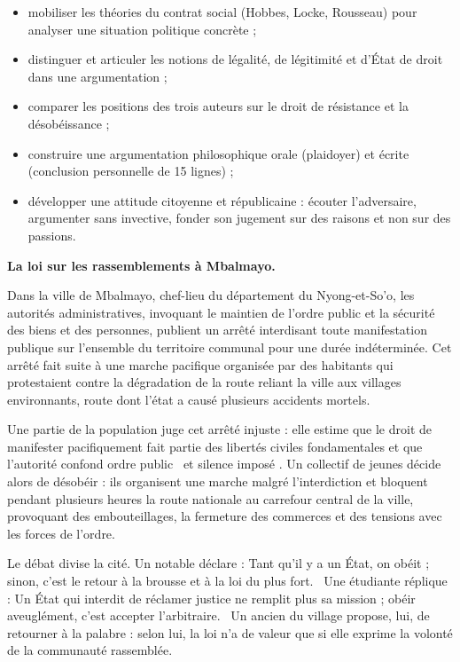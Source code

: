 \documentclass[11pt]{article}
\newcommand{\cle}[1]{{\popxbold\color{popdark}#1}}
\newcounter{popsec}
\newcounter{popsub}
\newcommand{\courssub}[1]{%
  \stepcounter{popsub}%
  \par\vspace{9pt}\noindent{\popxbold\fontsize{11.5}{13}\selectfont\color{popink}{\color{poporange}\thepopsec.\thepopsub}\hspace{6pt}#1}\par\nopagebreak\vspace{4pt}
}
\begin{document}
\begin{itemize}
\item mobiliser les théories du \cle{contrat social} (Hobbes, Locke, Rousseau) pour analyser une situation politique concrète ;
\item distinguer et articuler les notions de \cle{légalité}, de \cle{légitimité} et d'\cle{État de droit} dans une argumentation ;
\item comparer les positions des trois auteurs sur le droit de résistance et la désobéissance ;
\item construire une argumentation philosophique orale (plaidoyer) et écrite (conclusion personnelle de 15 lignes) ;
\item développer une attitude citoyenne et républicaine : écouter l'adversaire, argumenter sans invective, fonder son jugement sur des raisons et non sur des passions.
\end{itemize}

\courssub{Situation}

\textbf{La loi sur les rassemblements à Mbalmayo.}\par

Dans la ville de Mbalmayo, chef-lieu du département du Nyong-et-So'o, les autorités administratives, invoquant le maintien de l'ordre public et la sécurité des biens et des personnes, publient un arrêté interdisant toute manifestation publique sur l'ensemble du territoire communal pour une durée indéterminée. Cet arrêté fait suite à une marche pacifique organisée par des habitants qui protestaient contre la dégradation de la route reliant la ville aux villages environnants, route dont l'état a causé plusieurs accidents mortels.

Une partie de la population juge cet arrêté \cle{injuste} : elle estime que le droit de manifester pacifiquement fait partie des libertés civiles fondamentales et que l'autorité confond \guillemotleft ordre public \guillemotright\ et \guillemotleft silence imposé \guillemotright. Un collectif de jeunes décide alors de désobéir : ils organisent une marche malgré l'interdiction et bloquent pendant plusieurs heures la route nationale au carrefour central de la ville, provoquant des embouteillages, la fermeture des commerces et des tensions avec les forces de l'ordre.

Le débat divise la cité. Un notable déclare : \guillemotleft Tant qu'il y a un État, on obéit ; sinon, c'est le retour à la brousse et à la loi du plus fort. \guillemotright\ Une étudiante réplique : \guillemotleft Un État qui interdit de réclamer justice ne remplit plus sa mission ; obéir aveuglément, c'est accepter l'arbitraire. \guillemotright\ Un ancien du village propose, lui, de \guillemotleft retourner à la palabre \guillemotright : selon lui, la loi n'a de valeur que si elle exprime la volonté de la communauté rassemblée.
\end{document}
